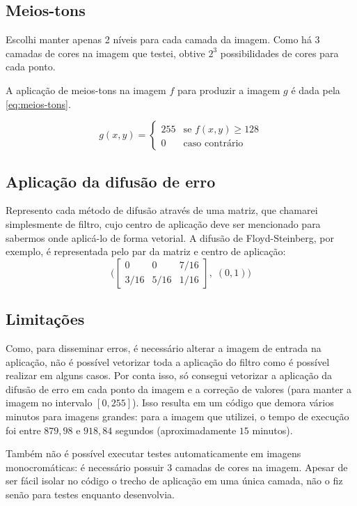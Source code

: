 \documentclass[brazilian,a4paper,twocolumn]{article}
\begin{document}
    \subsection{Meios-tons}

        Escolhi manter apenas 2 níveis para cada camada da imagem. Como há 3 camadas de cores na imagem que testei, obtive $ 2^3 $ possibilidades de cores para cada ponto.

        A aplicação de meios-tons na imagem $f$ para produzir a imagem $g$ é dada pela \cref{eq:meios-tons}.

        \begin{equation}
        \label{eq:meios-tons}
            g(x, y) =
            \begin{cases}
                255     & \text{se $f(x, y) \geq 128$} \\
                0       & \text{caso contrário}
            \end{cases}
        \end{equation}

    \subsection{Aplicação da difusão de erro}

        Represento cada método de difusão através de uma matriz, que chamarei simplesmente de filtro, cujo centro de aplicação deve ser mencionado para sabermos onde aplicá-lo de forma vetorial. A difusão de Floyd-Steinberg, por exemplo, é representada pelo par da matriz e centro de aplicação:
        \begin{equation*}
            \Bigg(
            \begin{bmatrix}
                0 & 0 & 7/16 \\
                3/16 & 5/16 & 1/16
            \end{bmatrix}
            ,\; (0, 1)
            \Bigg)
        \end{equation*}

    \subsection{Limitações}

        Como, para disseminar erros, é necessário alterar a imagem de entrada na aplicação, não é possível vetorizar toda a aplicação do filtro como é possível realizar em alguns casos. Por conta isso, só consegui vetorizar a aplicação da difusão de erro em cada ponto da imagem e a correção de valores (para manter a imagem no intervalo $[0, 255]$). Isso resulta em um código que demora vários minutos para imagens grandes: para a imagem que utilizei, o tempo de execução foi entre $879,98$ e $918,84$ segundos (aproximadamente $15$ minutos).

        Também não é possível executar testes automaticamente em imagens monocromáticas: é necessário possuir 3 camadas de cores na imagem. Apesar de ser fácil isolar no código o trecho de aplicação em uma única camada, não o fiz senão para testes enquanto desenvolvia.
\end{document}
